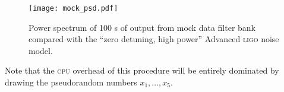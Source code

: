 \begin{figure}[h!]
\begin{center}
\texttt{[image: mock\_psd.pdf]}
\caption{Power spectrum of 100 s of output from mock data filter bank compared with the ``zero detuning, high power'' Advanced \textsc{ligo} noise model.}
\label{fig:mock-psd}
\end{center}
\end{figure}

Note that the \textsc{cpu} overhead of this procedure will be entirely dominated by drawing the pseudorandom numbers $x_1, \dots, x_5$.


\begin{comment}

\section{better noise model}

The assumption that the interferometer noise is well-modeled by a multivariate normal distribution is convenient, but false.  The presence of `glitches' in the interferometer, where the noise statistics change dramatically, is well documented.  Current methods, including ours in the form proposed in the paper, are easily fooled by these bursts of excess power, simply because the analyses assume that the only way that extra power can be introduced to the interferometer is by a gravitational wave.  The gravitational wave hypothesis $H_\mathrm{signal}$ will do a very poor job of explaining temporally coincident incoherent bursts of noise power in the interferometer, but the noise hypothesis $H_\mathrm{signal}$ in its simple form does even worse; the gravitational wave explanation is thus preferred.

We can generalize the noise hypothesis to cope with glitches by creating a model for glitches and adding that hypothesis to the set under consideration.  Like gravitational waves, glitches are infrequent, have poorly known waveforms, and poorly known power.  Unlike gravitational waves, they will not be correlated between instruments.



\end{comment}
